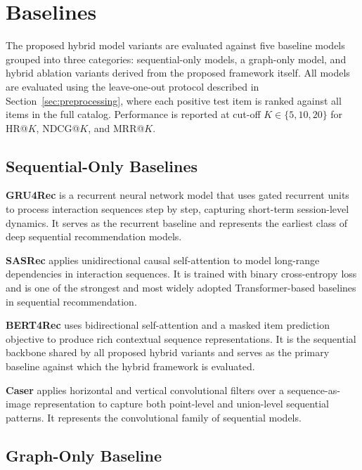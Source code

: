 \documentclass[12pt,a4paper]{report}
\begin{document}
\section{Baselines}
\label{sec:baselines}

\justifying
The proposed hybrid model variants are evaluated against five baseline models
grouped into three categories: sequential-only models, a graph-only model, and
hybrid ablation variants derived from the proposed framework itself. All models
are evaluated using the leave-one-out protocol described in
Section~\ref{sec:preprocessing}, where each positive test item is ranked
against all items in the full catalog. Performance is reported at cut-off
\(K \in \{5, 10, 20\}\) for HR@\(K\), NDCG@\(K\), and MRR@\(K\).

\subsection*{Sequential-Only Baselines}

\textbf{GRU4Rec} \citep{hidasi2016gru4rec} is a recurrent neural network model
that uses gated recurrent units to process interaction sequences step by step,
capturing short-term session-level dynamics. It serves as the recurrent
baseline and represents the earliest class of deep sequential recommendation
models.

\textbf{SASRec} \citep{kang2018sasrec} applies unidirectional causal
self-attention to model long-range dependencies in interaction sequences. It is
trained with binary cross-entropy loss and is one of the strongest and most
widely adopted Transformer-based baselines in sequential recommendation.

\textbf{BERT4Rec} \citep{sun2019bert4rec} uses bidirectional self-attention and
a masked item prediction objective to produce rich contextual sequence
representations. It is the sequential backbone shared by all proposed hybrid
variants and serves as the primary baseline against which the hybrid framework
is evaluated.

\textbf{Caser} \citep{tang2018caser} applies horizontal and vertical
convolutional filters over a sequence-as-image representation to capture both
point-level and union-level sequential patterns. It represents the
convolutional family of sequential models.

\subsection*{Graph-Only Baseline}
\end{document}
